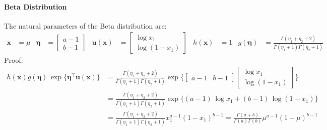 \documentclass[11pt, a4paper]{scrartcl}
\newcommand{\transposed}{{\!\top\!}}
\renewcommand{\vec}[1]{\bm{#1}}
\begin{document}
			\paragraph{Beta Distribution}
				The natural parameters of the Beta distribution are:
				\begin{align}
					\vec{x} &= \mu &
					\vec{\eta} &= \begin{bmatrix} a - 1 \\ b - 1 \end{bmatrix} &
					\vec{u}(\vec{x}) &= \begin{bmatrix} \log x_1 \\ \log(1 - x_1) \end{bmatrix} &
					h(\vec{x}) &= 1 &
					g(\vec{\eta}) &= \frac{\Gamma(\eta_1 + \eta_2 + 2)}{\Gamma(\eta_1 + 1) \Gamma(\eta_2 + 1)}
				\end{align}
				Proof:
				\begin{align}
					h(\vec{x}) g(\vec{\eta}) \,\exp\Big\{ \vec{\eta}^\transposed \vec{u}(\vec{x}) \Big\}
						&= \frac{\Gamma(\eta_1 + \eta_2 + 2)}{\Gamma(\eta_1 + 1) \Gamma(\eta_2 + 1)} \exp\Bigg\{ \begin{bmatrix} a - 1 & b - 1 \end{bmatrix} \begin{bmatrix} \log x_1 \\ \log(1 - x_1) \end{bmatrix}  \Bigg\} \\
						&= \frac{\Gamma(\eta_1 + \eta_2 + 2)}{\Gamma(\eta_1 + 1) \Gamma(\eta_2 + 1)} \exp\big\{ (a - 1) \, \log x_1 + (b - 1) \, \log(1 - x_1) \big\} \\
						&= \frac{\Gamma(\eta_1 + \eta_2 + 2)}{\Gamma(\eta_1 + 1) \Gamma(\eta_2 + 1)} x_1^{a - 1} (1 - x_1)^{b - 1}
						 = \frac{\Gamma(a + b)}{\Gamma(a) \Gamma(b)} \mu^{a - 1} (1 - \mu)^{b - 1}
				\end{align}
\end{document}
